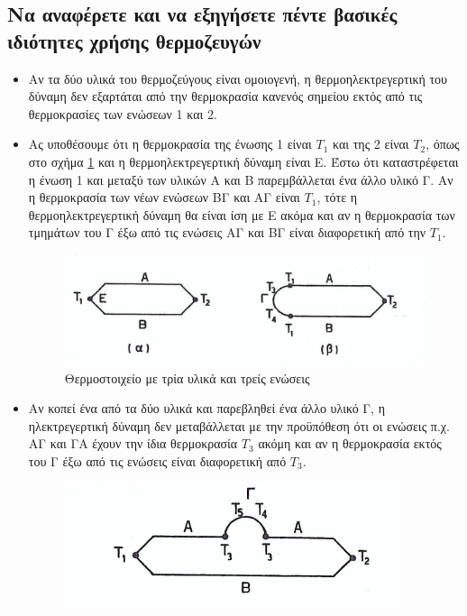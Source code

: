 \documentclass{article}
\begin{document}
\subsection{Να αναφέρετε και να εξηγήσετε πέντε βασικές ιδιότητες χρήσης θερμοζευγών}
\begin{itemize}
    \item Αν τα δύο υλικά του θερμοζεύγους είναι ομοιογενή, η θερμοηλεκτρεγερτική του δύναμη δεν εξαρτάται από την θερμοκρασία κανενός σημείου εκτός από τις θερμοκρασίες των ενώσεων 1
        και 2.
    \item Ας υποθέσουμε ότι η θερμοκρασία της ένωσης 1 είναι $Τ_1$ και της 2 είναι $Τ_2$, όπως στο σχήμα \ref{fig:7.1thermo1} και η θερμοηλεκτρεγερτική δύναμη είναι Ε. Έστω ότι καταστρέφεται η ένωση 1 και
        μεταξύ των υλικών Α και Β παρεμβάλλεται ένα άλλο υλικό Γ. Αν η θερμοκρασία των νέων ενώσεων ΒΓ και ΑΓ είναι $Τ_1$, τότε η θερμοηλεκτρεγερτική δύναμη θα είναι ίση με Ε ακόμα και αν
        η θερμοκρασία των τμημάτων του Γ έξω από τις ενώσεις ΑΓ και ΒΓ είναι διαφορετική από την $Τ_1$.
        \begin{figure}[h!]
            \includegraphics[width=\linewidth]{thermozevgi1.png}
            \caption{Θερμοστοιχείο με τρία υλικά και τρείς ενώσεις}
            \label{fig:7.1thermo1}
        \end{figure}
    \item Αν κοπεί ένα από τα δύο υλικά και παρεβληθεί ένα άλλο υλικό Γ, η ηλεκτρεγερτική δύναμη δεν μεταβάλλεται με την προϋπόθεση ότι οι ενώσεις π.χ. ΑΓ και ΓΑ έχουν την ίδια 
        θερμοκρασία $Τ_3$ ακόμη και αν η θερμοκρασία εκτός του Γ έξω από τις ενώσεις είναι διαφορετική από $Τ_3$.
        \begin{figure}[h!]
            \includegraphics[width=\linewidth]{thermozevgi2.png}

\end{figure}
\end{itemize}
\end{document}
